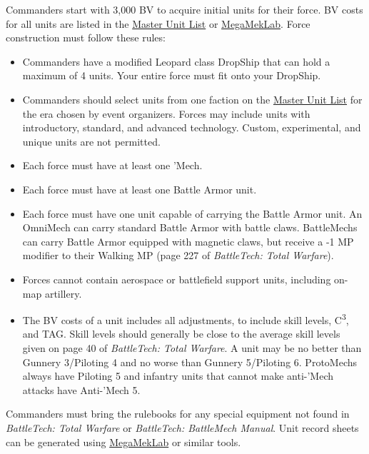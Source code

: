 Commanders start with 3,000 BV to acquire initial units for their force.
BV costs for all units are listed in the \href{http://www.masterunitlist.info}{Master Unit List} or \href{https://megamek.org}{MegaMekLab}.
Force construction must follow these rules:

\begin{itemize}

\item Commanders have a modified Leopard class DropShip that can hold a maximum of 4 units.
Your entire force must fit onto your DropShip.

\item Commanders should select units from one faction on the \href{http://www.masterunitlist.info/}{Master Unit List} for the era chosen by event organizers.
Forces may include units with introductory, standard, and advanced technology.
Custom, experimental, and unique units are not permitted.

\item Each force must have at least one 'Mech.

\item Each force must have at least one Battle Armor unit.

\item Each force must have one unit capable of carrying the Battle Armor unit.
An OmniMech can carry standard Battle Armor with battle claws.
BattleMechs can carry Battle Armor equipped with magnetic claws, but receive a -1 MP modifier to their Walking MP (page 227 of \emph{BattleTech: Total Warfare}).

\item Forces cannot contain aerospace or battlefield support units, including on-map artillery.

\item The BV costs of a unit includes all adjustments, to include skill levels, C\textsuperscript{3}, and TAG.
Skill levels should generally be close to the average skill levels given on page 40 of \emph{BattleTech: Total Warfare}.
A unit may be no better than Gunnery 3/Piloting 4 and no worse than Gunnery 5/Piloting 6.
ProtoMechs always have Piloting 5 and infantry units that cannot make anti-'Mech attacks have Anti-'Mech 5.

\end{itemize}

Commanders must bring the rulebooks for any special equipment not found in \emph{BattleTech: Total Warfare} or \emph{BattleTech: BattleMech Manual}.
Unit record sheets can be generated using \href{https://megamek.org}{MegaMekLab} or similar tools.


